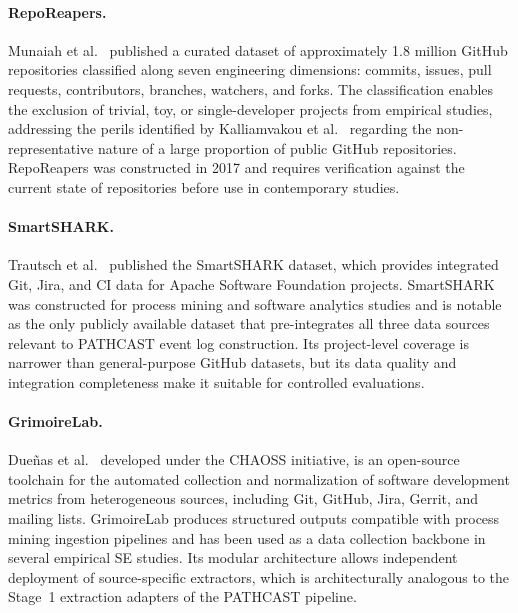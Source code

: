 \paragraph{RepoReapers.}
Munaiah et al.~\cite{munaiah2017reporeapers} published a curated dataset
of approximately 1.8 million GitHub repositories classified along seven
engineering dimensions: commits, issues, pull requests, contributors,
branches, watchers, and forks. The classification enables the exclusion of
trivial, toy, or single-developer projects from empirical studies,
addressing the perils identified by Kalliamvakou et
al.~\cite{kochhar2019moving} regarding the non-representative nature of a
large proportion of public GitHub repositories. RepoReapers was
constructed in 2017 and requires verification against the current state of
repositories before use in contemporary studies.

\paragraph{SmartSHARK.}
Trautsch et al.~\cite{trautsch2020smartshark} published the SmartSHARK
dataset, which provides integrated Git, Jira, and CI data for Apache
Software Foundation projects. SmartSHARK was constructed for process
mining and software analytics studies and is notable as the only publicly
available dataset that pre-integrates all three data sources relevant to
PATHCAST event log construction. Its project-level coverage is narrower
than general-purpose GitHub datasets, but its data quality and
integration completeness make it suitable for controlled evaluations.

\paragraph{GrimoireLab.}
Dueñas et al.~\cite{dueenas2021grimoirelab} developed under the CHAOSS
initiative, is an open-source toolchain for the automated collection and
normalization of software development metrics from heterogeneous sources,
including Git, GitHub, Jira, Gerrit, and mailing lists. GrimoireLab
produces structured outputs compatible with process mining ingestion
pipelines and has been used as a data collection backbone in several
empirical SE studies. Its modular architecture allows independent
deployment of source-specific extractors, which is architecturally
analogous to the Stage~1 extraction adapters of the PATHCAST pipeline.

